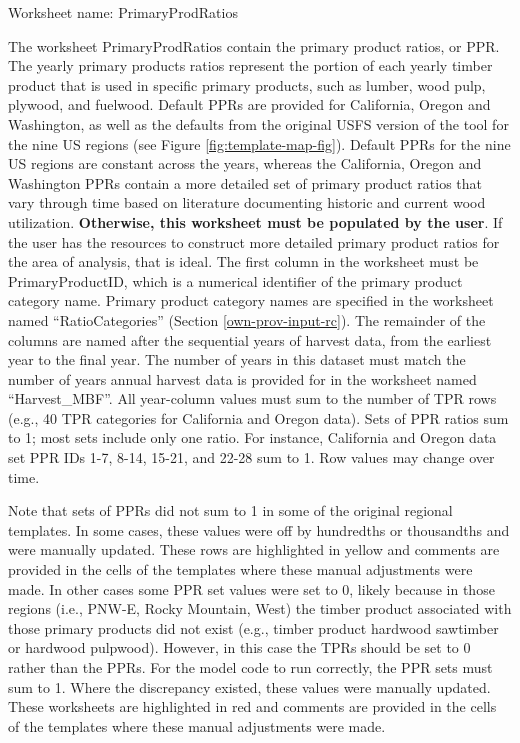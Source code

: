 \documentclass[
  openany]{book}
\begin{document}
Worksheet name: PrimaryProdRatios

The worksheet PrimaryProdRatios contain the primary product ratios, or PPR. The yearly primary products ratios represent the portion of each yearly timber product that is used in specific primary products, such as lumber, wood pulp, plywood, and fuelwood. Default PPRs are provided for California, Oregon and Washington, as well as the defaults from the original USFS version of the tool for the nine US regions (see Figure \ref{fig:template-map-fig}). Default PPRs for the nine US regions are constant across the years, whereas the California, Oregon and Washington PPRs contain a more detailed set of primary product ratios that vary through time based on literature documenting historic and current wood utilization. \textbf{Otherwise, this worksheet must be populated by the user}. If the user has the resources to construct more detailed primary product ratios for the area of analysis, that is ideal. The first column in the worksheet must be PrimaryProductID, which is a numerical identifier of the primary product category name. Primary product category names are specified in the worksheet named ``RatioCategories'' (Section \ref{own-prov-input-rc}). The remainder of the columns are named after the sequential years of harvest data, from the earliest year to the final year. The number of years in this dataset must match the number of years annual harvest data is provided for in the worksheet named ``Harvest\_MBF''. All year-column values must sum to the number of TPR rows (e.g., 40 TPR categories for California and Oregon data). Sets of PPR ratios sum to 1; most sets include only one ratio. For instance, California and Oregon data set PPR IDs 1-7, 8-14, 15-21, and 22-28 sum to 1. Row values may change over time.

Note that sets of PPRs did not sum to 1 in some of the original regional templates. In some cases, these values were off by hundredths or thousandths and were manually updated. These rows are highlighted in yellow and comments are provided in the cells of the templates where these manual adjustments were made. In other cases some PPR set values were set to 0, likely because in those regions (i.e., PNW-E, Rocky Mountain, West) the timber product associated with those primary products did not exist (e.g., timber product hardwood sawtimber or hardwood pulpwood). However, in this case the TPRs should be set to 0 rather than the PPRs. For the model code to run correctly, the PPR sets must sum to 1. Where the discrepancy existed, these values were manually updated. These worksheets are highlighted in red and comments are provided in the cells of the templates where these manual adjustments were made.
\end{document}
